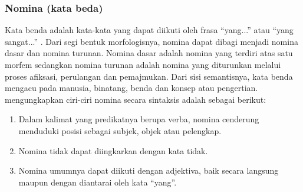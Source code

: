 \subsubsection{Nomina (kata beda)}
Kata benda adalah kata-kata yang dapat diikuti oleh frasa ``yang...'' atau ``yang sangat...'' \citep{chaer}. Dari segi bentuk morfologisnya, nomina dapat dibagi menjadi nomina dasar dan nomina turunan. Nomina dasar adalah nomina yang terdiri atas satu morfem sedangkan nomina turunan adalah nomina yang diturunkan melalui proses afiksasi, perulangan dan pemajmukan. Dari sisi semantisnya, kata benda mengacu pada manusia, binatang, benda dan konsep atau pengertian. \citet{alwi} mengungkapkan ciri-ciri nomina secara sintaksis adalah sebagai berikut:
\begin{enumerate}
	\item Dalam kalimat yang predikatnya berupa verba, nomina cenderung menduduki posisi sebagai subjek, objek atau pelengkap.
	
	\item Nomina tidak dapat diingkarkan dengan kata tidak.
	
	\item Nomina umumnya dapat diikuti dengan adjektiva, baik secara langsung maupun dengan diantarai oleh kata ``yang''.
\end{enumerate}

